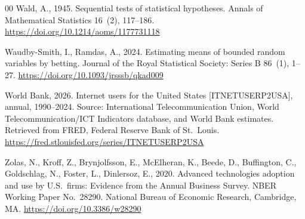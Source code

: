 \documentclass[review,authoryear,12pt]{elsarticle}
\begin{document}
\begin{thebibliography}{00}
Wald, A., 1945. Sequential tests of statistical hypotheses. Annals of Mathematical Statistics 16~(2), 117--186. \url{https://doi.org/10.1214/aoms/1177731118}

Waudby-Smith, I., Ramdas, A., 2024. Estimating means of bounded random variables by betting. Journal of the Royal Statistical Society: Series B 86~(1), 1--27. \url{https://doi.org/10.1093/jrsssb/qkad009}

World Bank, 2026. Internet users for the United States [ITNETUSERP2USA], annual, 1990--2024. Source: International Telecommunication Union, World Telecommunication/ICT Indicators database, and World Bank estimates. Retrieved from FRED, Federal Reserve Bank of St.\ Louis. \url{https://fred.stlouisfed.org/series/ITNETUSERP2USA}

Zolas, N., Kroff, Z., Brynjolfsson, E., McElheran, K., Beede, D., Buffington, C., Goldschlag, N., Foster, L., Dinlersoz, E., 2020. Advanced technologies adoption and use by U.S.\ firms: Evidence from the Annual Business Survey. NBER Working Paper No.\ 28290. National Bureau of Economic Research, Cambridge, MA. \url{https://doi.org/10.3386/w28290}

\end{thebibliography}
\end{document}
